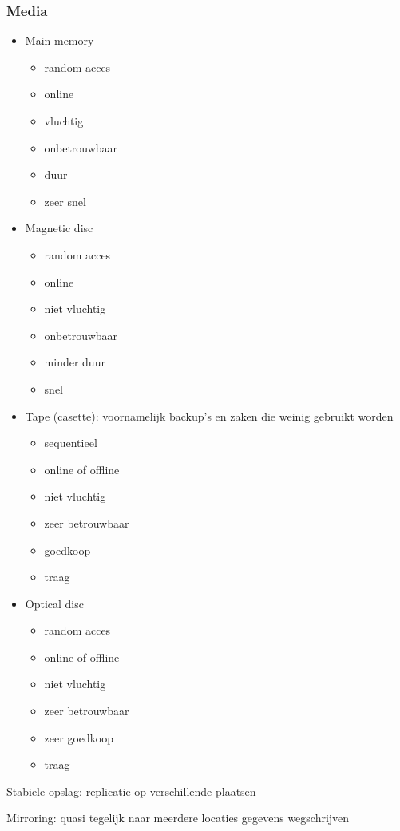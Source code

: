 \documentclass[a4paper,12pt]{article}
\begin{document}
\subsubsection{Media}
\begin{itemize}
\item Main memory
	\begin{itemize}
	\item random acces
	\item online
	\item vluchtig
	\item onbetrouwbaar
	\item duur
	\item zeer snel
	\end{itemize}
\item Magnetic disc
	\begin{itemize}
	\item random acces
	\item online
	\item niet vluchtig
	\item onbetrouwbaar
	\item minder duur
	\item snel
	\end{itemize}
\item Tape (casette): voornamelijk backup's en zaken die weinig gebruikt worden
	\begin{itemize}
	\item sequentieel
	\item online of offline
	\item niet vluchtig
	\item zeer betrouwbaar
	\item goedkoop
	\item traag
	\end{itemize}
\item Optical disc
	\begin{itemize}
	\item random acces
	\item online of offline
	\item niet vluchtig
	\item zeer betrouwbaar
	\item zeer goedkoop
	\item traag
	\end{itemize}
\end{itemize}
Stabiele opslag: replicatie op verschillende plaatsen

Mirroring: quasi tegelijk naar meerdere locaties gegevens wegschrijven
\end{document}
